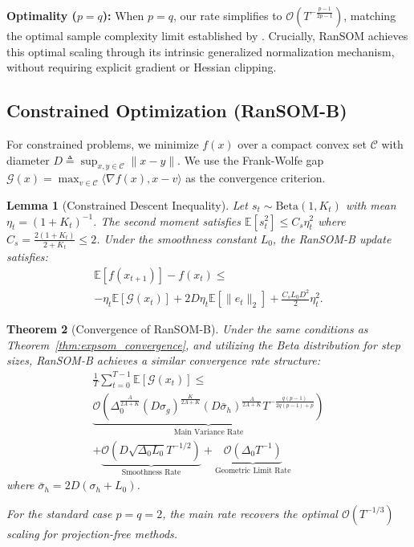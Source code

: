 \documentclass{article}
\theoremstyle{plain}
\newtheorem{theorem}{Theorem}[section]
\newtheorem{lemma}[theorem]{Lemma}
\theoremstyle{definition}
\theoremstyle{remark}
\begin{document}
\textbf{Optimality ($p=q$):} When $p=q$, our rate simplifies to $\mathcal{O}\left( T^{-\frac{p-1}{2p-1}} \right)$, matching the optimal sample complexity limit established by \citet{sadiev2025second}. Crucially, RanSOM achieves this optimal scaling through its intrinsic generalized normalization mechanism, without requiring explicit gradient or Hessian clipping.

\subsection{Constrained Optimization (RanSOM-B)}

For constrained problems, we minimize $f(x)$ over a compact convex set $\mathcal{C}$ with diameter $D \triangleq \sup_{x,y \in \mathcal{C}} \|x-y\|$. We use the Frank-Wolfe gap $\mathcal{G}(x) = \max_{v \in \mathcal{C}} \langle \nabla f(x), x-v \rangle$ as the convergence criterion.

\begin{lemma}[Constrained Descent Inequality]
\label{lemma:constrained_descent}
Let $s_t \sim \mathrm{Beta}(1, K_t)$ with mean $\eta_t = (1+K_t)^{-1}$. The second moment satisfies $\mathbb{E}[s_t^2] \le C_s \eta_t^2$ where $C_s = \frac{2(1+K_t)}{2+K_t} \le 2$. Under the smoothness constant $L_0$, the RanSOM-B update satisfies:
\begin{multline}
    \mathbb{E}[f(x_{t+1})] - f(x_t) \le \\ -\eta_t \mathbb{E}[\mathcal{G}(x_t)] + 2 D \eta_t \mathbb{E}[\|e_t\|_2] + \frac{C_s L_0 D^2}{2} \eta_t^2.
\end{multline}
\end{lemma}

\begin{theorem}[Convergence of RanSOM-B]
\label{thm:betasom_convergence}
Under the same conditions as Theorem~\ref{thm:expsom_convergence}, and utilizing the Beta distribution for step sizes, RanSOM-B achieves a similar convergence rate structure:
\begin{multline}
    \frac{1}{T} \sum_{t=0}^{T-1} \mathbb{E}[\mathcal{G}(x_t)] \le \\ \underbrace{\mathcal{O}\left( \Delta_0^{\frac{A}{2A+K}} (D \sigma_g)^{\frac{K}{2A+K}} (D \bar{\sigma}_h)^{\frac{A}{2A+K}} T^{-\frac{q(p-1)}{2q(p-1)+p}} \right)}_{\text{Main Variance Rate}} \nonumber \\
     + \underbrace{\mathcal{O}\left( D \sqrt{\Delta_0 L_0} T^{-1/2} \right)}_{\text{Smoothness Rate}} \nonumber
     + \underbrace{\mathcal{O}\left( \Delta_0 T^{-1} \right)}_{\text{Geometric Limit Rate}}
\end{multline}
where $\bar{\sigma}_h = 2D (\sigma_h + L_0)$.


For the standard case $p=q=2$, the main rate recovers the optimal $\mathcal{O}(T^{-1/3})$ scaling for projection-free methods.
\end{theorem}
\end{document}
